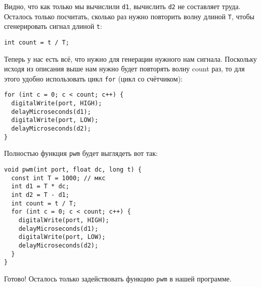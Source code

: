\documentclass[../sparc.tex]{subfiles}
\begin{document}
Видно, что как только мы вычислили \texttt{d1}, вычислить \texttt{d2} не
составляет труда. Осталось только посчитать, сколько раз нужно повторить волну
длиной \texttt{T}, чтобы сгенерировать сигнал длиной \texttt{t}:

\begin{verbatim}
int count = t / T;
\end{verbatim}

Теперь у нас есть всё, что нужно для генерации нужного нам сигнала. Поскольку
исходя из описания выше нам нужно будет повторять волну count раз, то для этого
удобно использовать цикл \texttt{for} (цикл со счётчиком):

\begin{verbatim}
for (int c = 0; c < count; c++) {
  digitalWrite(port, HIGH);
  delayMicroseconds(d1);
  digitalWrite(port, LOW);
  delayMicroseconds(d2);
}
\end{verbatim}

Полностью функция \texttt{pwm} будет выглядеть вот так:

\begin{verbatim}
void pwm(int port, float dc, long t) {
  const int T = 1000; // мкс
  int d1 = T * dc;
  int d2 = T - d1;
  int count = t / T;
  for (int c = 0; c < count; c++) {
    digitalWrite(port, HIGH);
    delayMicroseconds(d1);
    digitalWrite(port, LOW);
    delayMicroseconds(d2);
  }
}
\end{verbatim}

Готово! Осталось только задействовать функцию \texttt{pwm} в нашей программе.
\end{document}
